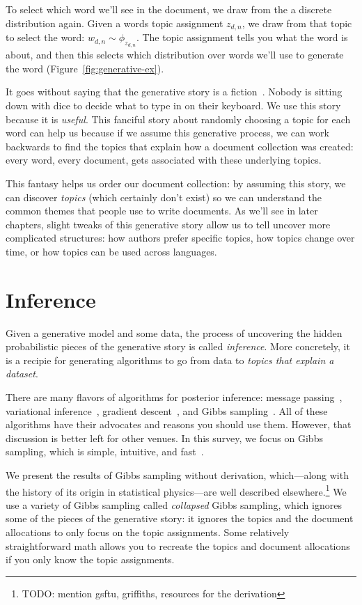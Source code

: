 To select which word we'll see in the document, we draw from the a discrete
distribution again.  Given a words topic assignment $z_{d,n}$, we draw from that
topic to select the word: $w_{d,n} \sim \phi_{z_{d,n}}$.  The topic assignment
tells you what the word is about, and then this selects which distribution over
words we'll use to generate the word (Figure~\ref{fig:generative-ex}).

It goes without saying that the generative story is a fiction~\citep{box-87}.
Nobody is sitting down with dice to decide what to type in on their keyboard.
We use this story because it is \emph{useful}.  This fanciful story about randomly
choosing a topic for each word can help us because if we assume this generative
process, we can work backwards to find the topics that explain how a document
collection was created: every word, every document, gets associated with these
underlying topics.

This fantasy helps us order our document collection: by assuming this story, we
can discover \emph{topics} (which certainly don't exist) so we can understand
the common themes that people use to write documents.  As we'll see in later
chapters, slight tweaks of this generative story allow us to tell uncover more
complicated structures: how authors prefer specific topics, how topics change
over time, or how topics can be used across languages.

\section{Inference}

Given a generative model and some data, the process of uncovering the hidden
probabilistic pieces of the generative story is called \emph{inference}.  More
concretely, it is a recipie for generating algorithms to go from data to
\emph{topics that explain a dataset}.

There are many flavors of algorithms for posterior inference: message
passing~\citep{zeng-13}, variational inference~\citep{blei-03}, gradient
descent~\citep{hoffman-10}, and Gibbs sampling~\citep{griffiths-04}.  All of
these algorithms have their advocates and reasons you should use them.  However,
that discussion is better left for other venues.  In this survey, we focus
on Gibbs sampling, which is simple, intuitive, and fast~\citep{yao-09}.

We present the results of Gibbs sampling without derivation, which---along with
the history of its origin in statistical physics---are well described
elsewhere.\footnote{TODO: mention gsftu, griffiths, resources for the
  derivation} We use a variety of Gibbs sampling called \emph{collapsed} Gibbs
sampling, which ignores some of the pieces of the generative story: it ignores
the topics and the document allocations to only focus on the topic assignments.
Some relatively straightforward math allows you to recreate the topics and
document allocations if you only know the topic assignments.

